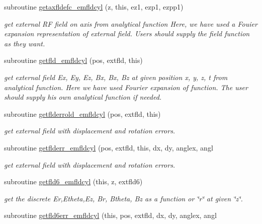 \begin{DoxyCompactItemize}
subroutine \mbox{\hyperlink{namespaceemfldcylclass_a6e60352b9a6d8b289d85b9ddcc2b9336}{getaxfldefc\+\_\+emfldcyl}} (z, this, ez1, ezp1, ezpp1)
\begin{DoxyCompactList}\small\item\em get external RF field on axis from analytical function Here, we have used a Fouier expansion representation of external field. Users should supply the field function as they want. \end{DoxyCompactList}\item 
subroutine \mbox{\hyperlink{namespaceemfldcylclass_a521fd72bfe439ce6611678e767ee9263}{getfld\+\_\+emfldcyl}} (pos, extfld, this)
\begin{DoxyCompactList}\small\item\em get external field Ex, Ey, Ez, Bx, Bx, Bz at given position x, y, z, t from analytical function. Here we have used Fourier expansion of function. The user should supply his own analytical function if needed. \end{DoxyCompactList}\item 
subroutine \mbox{\hyperlink{namespaceemfldcylclass_a413e910d3137ed962527e2738f50e528}{getflderrold\+\_\+emfldcyl}} (pos, extfld, this)
\begin{DoxyCompactList}\small\item\em get external field with displacement and rotation errors. \end{DoxyCompactList}\item 
subroutine \mbox{\hyperlink{namespaceemfldcylclass_a2527e326fcd93dd1a661712a4c591de1}{getflderr\+\_\+emfldcyl}} (pos, extfld, this, dx, dy, anglex, angl
\begin{DoxyCompactList}\small\item\em get external field with displacement and rotation errors. \end{DoxyCompactList}\item 
subroutine \mbox{\hyperlink{namespaceemfldcylclass_ace5420817acc583fa855b546b70f6a5e}{getfld6\+\_\+emfldcyl}} (this, z, extfld6)
\begin{DoxyCompactList}\small\item\em get the discrete Er,Etheta,Ez, Br, Btheta, Bz as a function or \char`\"{}r\char`\"{} at given \char`\"{}z\char`\"{}. \end{DoxyCompactList}\item 
subroutine \mbox{\hyperlink{namespaceemfldcylclass_a4285c0422f781555210bb16c345c3e23}{getfld6err\+\_\+emfldcyl}} (this, pos, extfld, dx, dy, anglex, angl
\item 

\end{DoxyCompactItemize}

